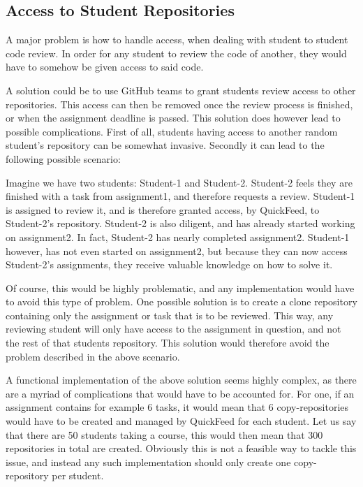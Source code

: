 \subsection{Access to Student Repositories}

A major problem is how to handle access, when dealing with student to student code review.
In order for any student to review the code of another, they would have to somehow be given access to said code.

A solution could be to use GitHub teams to grant students review access to other repositories.
This access can then be removed once the review process is finished, or when the assignment deadline is passed.
This solution does however lead to possible complications.
First of all, students having access to another random student's repository can be somewhat invasive.
Secondly it can lead to the following possible scenario:

Imagine we have two students: Student-1 and Student-2.
Student-2 feels they are finished with a task from assignment1, and therefore requests a review.
Student-1 is assigned to review it, and is therefore granted access, by QuickFeed, to Student-2's repository.
Student-2 is also diligent, and has already started working on assignment2.
In fact, Student-2 has nearly completed assignment2.
Student-1 however, has not even started on assignment2, but because they can now access Student-2's assignments, they receive valuable knowledge on how to solve it.

Of course, this would be highly problematic, and any implementation would have to avoid this type of problem.
One possible solution is to create a clone repository containing only the assignment or task that is to be reviewed. 
This way, any reviewing student will only have access to the assignment in question, and not the rest of that students repository.
This solution would therefore avoid the problem described in the above scenario.

A functional implementation of the above solution seems highly complex, as there are a myriad of complications that would have to be accounted for.
For one, if an assignment contains for example 6 tasks, it would mean that 6 copy-repositories would have to be created and managed by QuickFeed for each student.
Let us say that there are 50 students taking a course, this would then mean that 300 repositories in total are created.
Obviously this is not a feasible way to tackle this issue, and instead any such implementation should only create one copy-repository per student.

